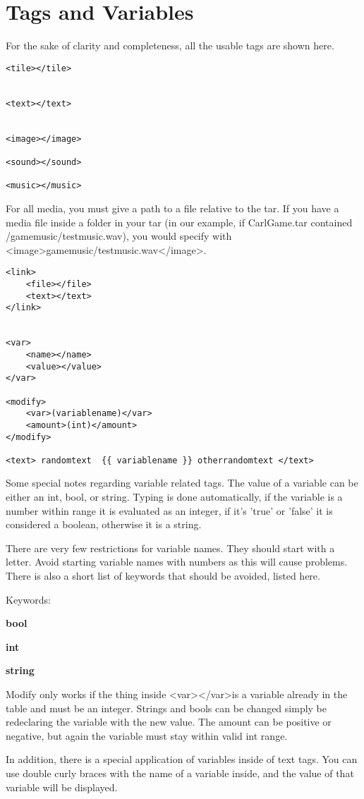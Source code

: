 \documentclass[11pt]{article}
\begin{document}
\section{Tags and Variables}

For the sake of clarity and completeness, all the usable tags are shown here. 

\begin{lstlisting}
<tile></tile>


<text></text>


<image></image>

<sound></sound>

<music></music>
\end{lstlisting}

For all media, you must give a path to a file relative to the tar. If you have a media file inside a folder in your tar (in our example, if CarlGame.tar contained /gamemusic/testmusic.wav), you would specify with \textless image\textgreater gamemusic/testmusic.wav\textless /image\textgreater. 
	
\begin{lstlisting}
<link>
	<file></file>
	<text></text>
</link>


<var>
	<name></name>
	<value></value>
</var>

<modify>
	<var>(variablename)</var>
	<amount>(int)</amount>
</modify>

<text> randomtext  {{ variablename }} otherrandomtext </text>

\end{lstlisting}

Some special notes regarding variable related tags. The value of a variable can be either an int, bool, or string. Typing is done automatically, if the variable is a number within range it is evaluated as an integer, if it's 'true' or 'false' it is considered a boolean, otherwise it is a string. 

There are very few restrictions for variable names. They should start with a letter. Avoid starting variable names with numbers as this will cause problems. There is also a short list of keywords that should be avoided, listed here.

Keywords:

\textbf{bool}

\textbf{int}

\textbf{string}

Modify only works if the thing inside \textless var\textgreater \textless /var\textgreater is a variable already in the table and must be an integer. Strings and bools can be changed simply be redeclaring the variable with the new value. The amount can be positive or negative, but again the variable must stay within valid int range. 

In addition, there is a special application of variables inside of text tags. You can use double curly braces with the name of a variable inside, and the value of that variable will be displayed. 
\end{document}
